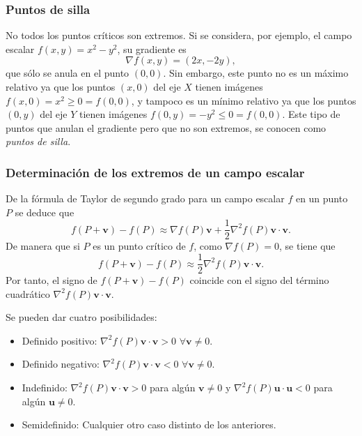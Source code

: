 \begin{frame}
	\frametitle{Puntos de silla}
	No todos los puntos críticos son extremos. 
	Si se considera, por ejemplo, el campo escalar $f(x,y)=x^2-y^2$, su gradiente es
	\[
		\nabla f(x,y) = (2x,-2y),
	\]
	que sólo se anula en el punto $(0,0)$. 
	Sin embargo, este punto no es un máximo relativo ya que los puntos $(x,0)$ del eje $X$ tienen imágenes $f(x,0)=x^2\geq
	0=f(0,0)$, y tampoco es un mínimo relativo ya que los puntos $(0,y)$ del eje $Y$ tienen imágenes $f(0,y)=-y^2\leq
	0=f(0,0)$.
	Este tipo de puntos que anulan el gradiente pero que no son extremos, se conocen como \emph{puntos de silla}.
	\begin{center}
		\scalebox{1}{}
	\end{center}
\end{frame}


\begin{frame}
	\frametitle{Determinación de los extremos de un campo escalar}
	De la fórmula de Taylor de segundo grado para un campo escalar $f$ en un punto $P$ se deduce que
	\[
		f(P+\mathbf{v})-f(P) \approx \nabla f(P)\mathbf{v}+\frac{1}{2}\nabla^2f(P)\mathbf{v}\cdot\mathbf{v}.
	\]
	De manera que si $P$ es un punto crítico de $f$, como $\nabla f(P)=0$, se tiene que 
	\[
		f(P+\mathbf{v})-f(P) \approx \frac{1}{2}\nabla^2f(P)\mathbf{v}\cdot\mathbf{v}.
	\]
	Por tanto, el signo de $f(P+\mathbf{v})-f(P)$ coincide con el signo del término cuadrático $\nabla^2f(P)\mathbf{v}\cdot\mathbf{v}$.
	
	Se pueden dar cuatro posibilidades:
	\begin{itemize}
		\item Definido positivo: $\nabla^2f(P)\mathbf{v}\cdot\mathbf{v}>0$ $\forall \mathbf{v}\neq 0$.
		\item Definido negativo: $\nabla^2f(P)\mathbf{v}\cdot\mathbf{v}<0$ $\forall \mathbf{v}\neq 0$.
		\item Indefinido: $\nabla^2f(P)\mathbf{v}\cdot\mathbf{v}>0$ para algún $\mathbf{v}\neq 0$ y  $\nabla^2f(P)\mathbf{u}\cdot\mathbf{u}<0$ para algún $\mathbf{u}\neq 0$.
		\item Semidefinido: Cualquier otro caso distinto de los anteriores.
	\end{itemize}
\end{frame}


